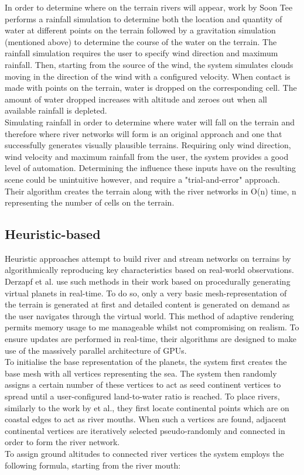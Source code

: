 In order to determine where on the terrain rivers will appear, work by Soon Tee \cite{Teoh2008} performs a rainfall simulation to determine both the location and quantity of water at different points on the terrain followed by a gravitation simulation (mentioned above) to determine the course of the water on the terrain. The rainfall simulation requires the user to specify wind direction and maximum rainfall. Then, starting from the source of the wind, the system simulates clouds moving in the direction of the wind with a configured velocity. When contact is made with points on the terrain, water is dropped on the corresponding cell. The amount of water dropped increases with altitude and zeroes out when all available rainfall is depleted. \\

Simulating rainfall in order to determine where water will fall on the terrain and therefore where river networks will form is an original approach and one that successfully generates visually plausible terrains. Requiring only wind direction, wind velocity and maximum rainfall from the user, the system provides a good level of automation. Determining the influence these inputs have on the resulting scene could be unintuitive however, and require a "trial-and-error" approach. Their algorithm creates the terrain along with the river networks in O(n) time, n representing the number of cells on the terrain.

\subsection{Heuristic-based}

Heuristic approaches attempt to build river and stream networks on terrains by algorithmically reproducing key characteristics based on real-world observations. \\

Derzapf et al. \cite{Derzapf2011} use such methods in their work based on procedurally generating virtual planets in real-time. To do so, only a very basic mesh-representation of the terrain is generated at first and detailed content is generated on demand as the user navigates through the virtual world. This method of adaptive rendering permits memory usage to me manageable whilst not compromising on realism. To ensure updates are performed in real-time, their algorithms are designed to make use of the massively parallel architecture of GPUs. \\
To initialise the base representation of the planets, the system first creates the base mesh with all vertices representing the sea. The system then randomly assigns a certain number of these vertices to act as seed continent vertices to spread until a user-configured land-to-water ratio is reached.
To place rivers, similarly to the work by \cite{Genevaux2013} et al., they first locate continental points which are on coastal edges to act as river mouths. When such a vertices are found, adjacent continental vertices are iteratively selected pseudo-randomly and connected in order to form the river network. \\
To assign ground altitudes to connected river vertices the system employs the following formula, starting from the river mouth:

